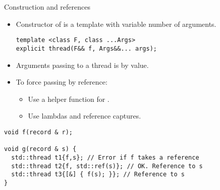 \begin{frame}[t,fragile]{Construction and references}
\begin{itemize}
  \item Constructor of  is a template with variable number of arguments.
\begin{lstlisting}
template <class F, class ...Args> 
explicit thread(F&& f, Args&&... args);
\end{lstlisting}
  \item Arguments passing to a thread is by value.
  \item To force passing by reference:
    \begin{itemize}
      \item Use a helper function for .
      \item Use lambdas and reference captures.
    \end{itemize}
\end{itemize}
\begin{block}{}
\begin{lstlisting}[basicstyle=\tiny]
void f(record & r);

void g(record & s) {
  std::thread t1{f,s}; // Error if f takes a reference
  std::thread t2{f, std::ref(s)}; // OK. Reference to s
  std::thread t3{[&] { f(s); }}; // Reference to s
}
\end{lstlisting}
\end{block}
\end{frame}

